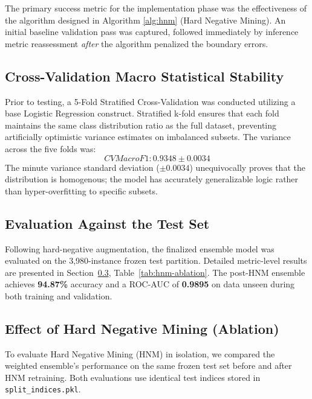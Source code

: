 The primary success metric for the implementation phase was the effectiveness of the algorithm designed in Algorithm \ref{alg:hnm} (Hard Negative Mining). An initial baseline validation pass was captured, followed immediately by inference metric reassessment \textit{after} the algorithm penalized the boundary errors.

\subsection{Cross-Validation Macro Statistical Stability}
Prior to testing, a 5-Fold Stratified Cross-Validation was conducted utilizing a base Logistic Regression construct. Stratified k-fold ensures that each fold maintains the same class distribution ratio as the full dataset, preventing artificially optimistic variance estimates on imbalanced subsets. The variance across the five folds was:
\[ CV Macro F1: 0.9348 \pm 0.0034 \]
The minute variance standard deviation ($\pm 0.0034$) unequivocally proves that the distribution is homogenous; the model has accurately generalizable logic rather than hyper-overfitting to specific subsets.

\subsection{Evaluation Against the Test Set}
Following hard-negative augmentation, the finalized ensemble model was evaluated on the 3,980-instance frozen test partition. Detailed metric-level results are presented in Section~\ref{sec:hnm-ablation}, Table~\ref{tab:hnm-ablation}. The post-HNM ensemble achieves \textbf{94.87\%} accuracy and a ROC-AUC of \textbf{0.9895} on data unseen during both training and validation.

\subsection{Effect of Hard Negative Mining (Ablation)}
\label{sec:hnm-ablation}

To evaluate Hard Negative Mining (HNM) in isolation, we compared the
weighted ensemble's performance on the same frozen test set before and
after HNM retraining. Both evaluations use identical test indices stored in
\texttt{split\_indices.pkl}.

